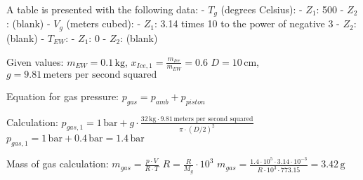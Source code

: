 A table is presented with the following data:  
- \( T_g \) (degrees Celsius):  
  - \( Z_1 \): 500  
  - \( Z_2 \): (blank)  
- \( V_g \) (meters cubed):  
  - \( Z_1 \): 3.14 times 10 to the power of negative 3  
  - \( Z_2 \): (blank)  
- \( T_{EW} \):  
  - \( Z_1 \): 0  
  - \( Z_2 \): (blank)  

Given values:  
\( m_{EW} = 0.1 \, \text{kg} \), \( x_{Ice,1} = \frac{m_{Ice}}{m_{EW}} = 0.6 \)  
\( D = 10 \, \text{cm} \), \( g = 9.81 \, \text{meters per second squared} \)  

Equation for gas pressure:  
\( p_{gas} = p_{amb} + p_{piston} \)  

Calculation:  
\( p_{gas,1} = 1 \, \text{bar} + g \cdot \frac{32 \, \text{kg} \cdot 9.81 \, \text{meters per second squared}}{\pi \cdot (D/2)^2} \)  
\( p_{gas,1} = 1 \, \text{bar} + 0.4 \, \text{bar} = 1.4 \, \text{bar} \)  

Mass of gas calculation:  
\( m_{gas} = \frac{p \cdot V}{R \cdot T} \)  
\( R = \frac{R}{M_g} \cdot 10^3 \)  
\( m_{gas} = \frac{1.4 \cdot 10^5 \cdot 3.14 \cdot 10^{-3}}{R \cdot 10^3 \cdot 773.15} = 3.42 \, \text{g} \)